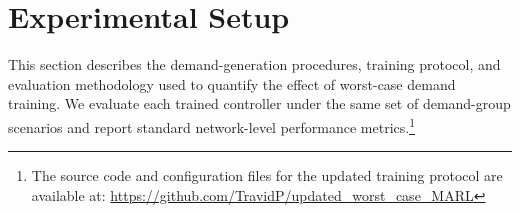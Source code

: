\documentclass[lettersize,journal]{IEEEtran}
\begin{document}

            


\section{Experimental Setup}
\label{sec:setup}


This section describes the demand-generation procedures, training protocol, and evaluation methodology used to quantify the effect of worst-case demand training. We evaluate each trained controller under the same set of demand-group scenarios and report standard network-level performance metrics.\footnote{The source code and configuration files for the updated training protocol are available at: \url{https://github.com/TravidP/updated_worst_case_MARL}}
\end{document}
